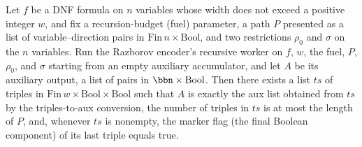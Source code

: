 \begin{lemma}
\label{SwitchingLemma.encode_go_wellformed}
\leanok
{}
Let $f$ be a DNF formula on $n$ variables whose width does not exceed a positive integer
$w$, and fix a recursion-budget (fuel) parameter, a path $P$ presented as a list of
variable–direction pairs in $\mathrm{Fin}\,n \times \mathrm{Bool}$, and two restrictions
$\rho_0$ and $\sigma$ on the $n$ variables. Run the Razborov encoder's recursive worker
on $f$, $w$, the fuel, $P$, $\rho_0$, and $\sigma$ starting from an empty auxiliary
accumulator, and let $A$ be its auxiliary output, a list of pairs in $\bbn \times
\mathrm{Bool}$. Then there exists a list $ts$ of triples in $\mathrm{Fin}\,w \times
\mathrm{Bool} \times \mathrm{Bool}$ such that $A$ is exactly the aux list obtained from
$ts$ by the triples-to-aux conversion, the number of triples in $ts$ is at most the
length of $P$, and, whenever $ts$ is nonempty, the marker flag (the final Boolean
component) of its last triple equals true.
\end{lemma}

